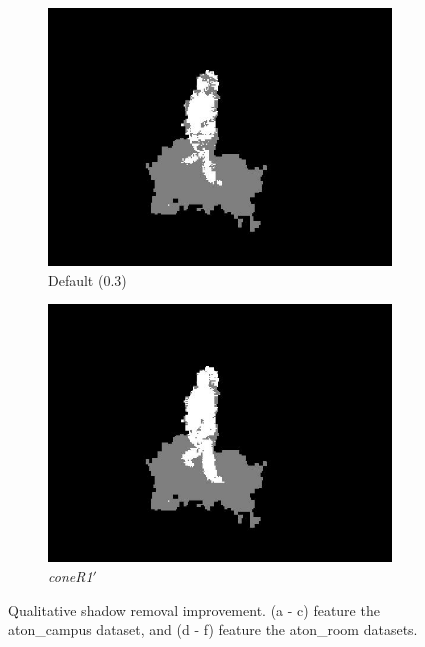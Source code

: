 \begin{figure}
  \hfill
  \begin{subfigure}{.32\linewidth}
  \includegraphics[width=1\linewidth]{figures/model/room_0275_default.jpg}
  \caption{Default (0.3)}
  \end{subfigure}
  \hfill
  \begin{subfigure}{.32\linewidth}
  \includegraphics[width=1\linewidth]{figures/model/room_0275_calc.jpg}
  \caption{\textit{coneR1}$'$}
  \end{subfigure}
  
\caption{Qualitative shadow removal improvement. (a - c) feature the aton\_campus dataset, and (d - f) feature the aton\_room datasets.}
\label{fig:qual_results}
\end{figure} 

